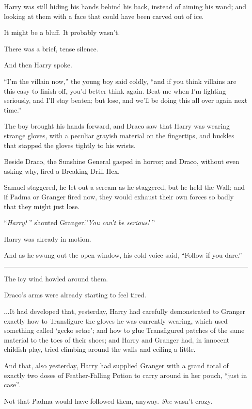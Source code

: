 Harry was still hiding his hands behind his back, instead of aiming his
wand; and looking at them with a face that could have been carved out of
ice.

It might be a bluff. It probably wasn't.

There was a brief, tense silence.

And then Harry spoke.

``I'm the villain now,'' the young boy said coldly, ``and if you think
villains are this easy to finish off, you'd better think again. Beat me
when I'm fighting seriously, and I'll stay beaten; but lose, and we'll
be doing this all over again next time.''

The boy brought his hands forward, and Draco saw that Harry was wearing
strange gloves, with a peculiar grayish material on the fingertips, and
buckles that stapped the gloves tightly to his wrists.

Beside Draco, the Sunshine General gasped in horror; and Draco, without
even asking why, fired a Breaking Drill Hex.

Samuel staggered, he let out a scream as he staggered, but he held the
Wall; and if Padma or Granger fired now, they would exhaust their own
forces so badly that they might just lose.

``\emph{Harry!} '' shouted Granger.''\emph{You can't be serious!} ''

Harry was already in motion.

And as he swung out the open window, his cold voice said, ``Follow if
you dare.''

\begin{center}\rule{3in}{0.4pt}\end{center}

The icy wind howled around them.

Draco's arms were already starting to feel tired.

...It had developed that, yesterday, Harry had carefully
demonstrated to Granger exactly how to Transfigure the gloves he was
currently wearing, which used something called `gecko setae'; and how to
glue Transfigured patches of the same material to the toes of their
shoes; and Harry and Granger had, in innocent childish play, tried
climbing around the walls and ceiling a little.

And that, also yesterday, Harry had supplied Granger with a grand total
of exactly two doses of Feather-Falling Potion to carry around in her
pouch, ``just in case''.

Not that Padma would have followed them, anyway. \emph{She} wasn't
crazy.

